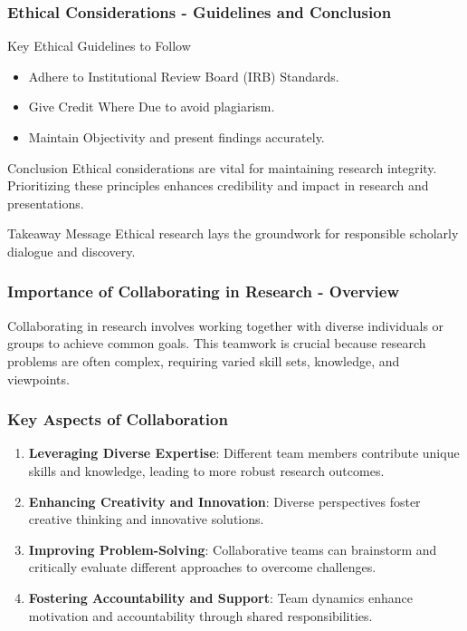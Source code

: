 \documentclass[aspectratio=169]{beamer}
\begin{document}
\begin{frame}[fragile]
    \frametitle{Ethical Considerations - Guidelines and Conclusion}
    \begin{block}{Key Ethical Guidelines to Follow}
        \begin{itemize}
            \item Adhere to Institutional Review Board (IRB) Standards.
            \item Give Credit Where Due to avoid plagiarism.
            \item Maintain Objectivity and present findings accurately.
        \end{itemize}
    \end{block}

    \begin{block}{Conclusion}
        Ethical considerations are vital for maintaining research integrity. Prioritizing these principles enhances credibility and impact in research and presentations.
    \end{block}

    \begin{block}{Takeaway Message}
        Ethical research lays the groundwork for responsible scholarly dialogue and discovery.
    \end{block}
\end{frame}

\begin{frame}[fragile]
    \frametitle{Importance of Collaborating in Research - Overview}
    Collaborating in research involves working together with diverse individuals or groups to achieve common goals. 
    This teamwork is crucial because research problems are often complex, requiring varied skill sets, knowledge, and viewpoints.
\end{frame}

\begin{frame}[fragile]
    \frametitle{Key Aspects of Collaboration}
    \begin{enumerate}
        \item \textbf{Leveraging Diverse Expertise}: Different team members contribute unique skills and knowledge, leading to more robust research outcomes.
        \item \textbf{Enhancing Creativity and Innovation}: Diverse perspectives foster creative thinking and innovative solutions.
        \item \textbf{Improving Problem-Solving}: Collaborative teams can brainstorm and critically evaluate different approaches to overcome challenges.
        \item \textbf{Fostering Accountability and Support}: Team dynamics enhance motivation and accountability through shared responsibilities.
    \end{enumerate}
\end{frame}
\end{document}

